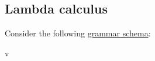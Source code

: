 \subsection{Lambda calculus}\label{subsec:lambda_calculus}

\begin{definition}\label{def:lambda_term}
     Consider the following \hyperref[def:backus_naur_form]{grammar schema}:
    \begin{bnf*}
              {v \in {}} \\
           {\bnfts{(} \bnfsp {} \bnfsp {} \bnfsp \bnfts{)}} \\
           {\bnfts{(} \bnfsp \bnfts{\( \lambda \)} \bnfsp \bnfts{\( \qdelim \)} \bnfsp {} \bnfsp \bnfts{)}} \\
                  { \bnfor {} \bnfor {}} \\
    \end{bnf*}
\end{definition}
